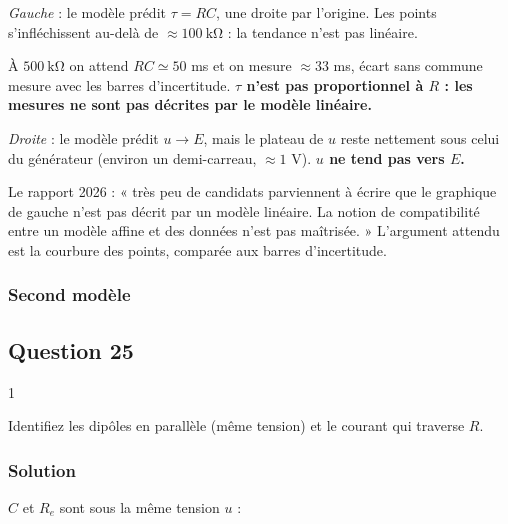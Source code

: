 \documentclass[11pt,a4paper]{article}
\newcommand{\equationajustee}[1]{%
  \sbox{\boiteequation}{$\displaystyle #1$}%
  \ifdim\wd\boiteequation>\linewidth
    \[\resizebox{\linewidth}{!}{\usebox{\boiteequation}}\]%
  \else
    \[#1\]%
  \fi}
\begin{document}
\emph{Gauche} : le modèle prédit \(\tau=RC\), une droite par l'origine. Les points s'infléchissent au-delà de \(\approx100\ \mathrm{k\Omega}\) : la tendance n'est pas linéaire.

À \(500\ \mathrm{k\Omega}\) on attend \(RC\simeq50\) ms et on mesure \(\approx33\) ms, écart sans commune mesure avec les barres d'incertitude. \textbf{\(\tau\) n'est pas proportionnel à \(R\) : les mesures ne sont pas décrites par le modèle linéaire.}

\emph{Droite} : le modèle prédit \(u\to E\), mais le plateau de \(u\) reste nettement sous celui du générateur (environ un demi-carreau, \(\approx1\) V). \textbf{\(u\) ne tend pas vers \(E\).}

\begin{jury}

Le rapport 2026 : « très peu de candidats parviennent à écrire que le graphique de gauche n'est pas décrit par un modèle linéaire. La notion de compatibilité entre un modèle affine et des données n'est pas maîtrisée. » L'argument attendu est la courbure des points, comparée aux barres d'incertitude.

\end{jury}

\hypertarget{second-moduxe8le}{%
\subsubsection{Second modèle}\label{second-moduxe8le}}

\hypertarget{question-25}{%
\subsection{Question 25}\label{question-25}}

\begin{indication}{1}

Identifiez les dipôles en parallèle (même tension) et le courant qui traverse \(R\).

\end{indication}

\hypertarget{solution-24}{%
\subsubsection{Solution}\label{solution-24}}

\(C\) et \(R_e\) sont sous la même tension \(u\) :

\equationajustee{\boxed{i_1=C\frac{\mathrm{d}u}{\mathrm{d}t}}}
\end{document}
